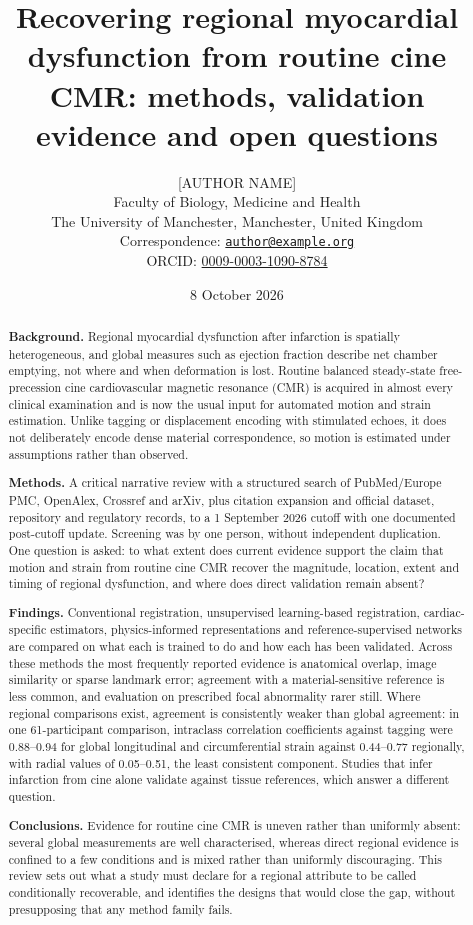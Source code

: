 \documentclass[11pt,a4paper]{article}
\title{\textbf{Recovering regional myocardial dysfunction from routine cine CMR:
methods, validation evidence and open questions}}
\author{[AUTHOR NAME]\\[0.3em]
\small Faculty of Biology, Medicine and Health\\
\small The University of Manchester, Manchester, United Kingdom\\[0.2em]
\small Correspondence: \href{mailto:author@example.org}{\nolinkurl{author@example.org}}\\
\small ORCID: \href{https://orcid.org/0009-0003-1090-8784}{0009-0003-1090-8784}}
\date{\small 8 October 2026}
\begin{document}
\linenumbers
\maketitle

\begin{abstract}
\noindent
\textbf{Background.} Regional myocardial dysfunction after infarction is spatially
heterogeneous, and global measures such as ejection fraction describe net chamber
emptying, not where and when deformation is lost. Routine balanced steady-state
free-precession cine cardiovascular magnetic resonance (CMR) is acquired in almost every clinical
examination and is now the usual input for automated motion and strain estimation. Unlike tagging or
displacement encoding with stimulated echoes, it does not deliberately encode dense material
correspondence, so motion is estimated under assumptions rather than observed.

\textbf{Methods.} A critical narrative review with a structured search of PubMed/Europe PMC, OpenAlex,
Crossref and arXiv, plus citation expansion and official dataset, repository and regulatory records,
to a 1 September 2026 cutoff with one documented post-cutoff update. Screening was by one person,
without independent duplication. One question is asked: to what extent does current evidence
support the claim that motion and strain from routine cine CMR recover the magnitude, location,
extent and timing of regional dysfunction, and where does direct validation remain absent?

\textbf{Findings.} Conventional registration, unsupervised learning-based registration,
cardiac-specific estimators, physics-informed representations and reference-supervised networks are
compared on what each is trained to do and how each has been validated. Across these methods
the most frequently reported evidence is anatomical overlap, image similarity or sparse
landmark error; agreement with a material-sensitive reference is less common, and evaluation on
prescribed focal abnormality rarer still. Where regional comparisons exist, agreement is
consistently weaker than global agreement: in one 61-participant comparison, intraclass correlation
coefficients against tagging were 0.88--0.94 for global longitudinal and circumferential strain
against 0.44--0.77 regionally, with radial values of 0.05--0.51, the least consistent
component. Studies that infer infarction from cine alone validate against tissue references, which
answer a different question.

\textbf{Conclusions.} Evidence for routine cine CMR is uneven rather than uniformly absent: several
global measurements are well characterised, whereas direct regional evidence is confined to a few
conditions and is mixed rather than uniformly discouraging. This
review sets out what a study must declare for a regional attribute to be called
conditionally recoverable, and identifies the designs that would close the gap, without presupposing
that any method family fails.
\end{abstract}
\end{document}
